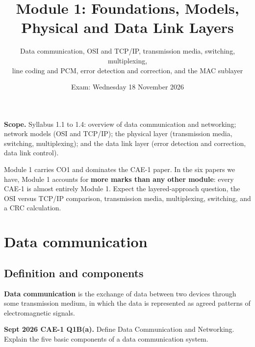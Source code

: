 \documentclass[11pt,a4paper]{article}
\title{\textbf{Module 1: Foundations, Models, Physical and Data Link Layers}\\}
\author{\large Data communication, OSI and TCP/IP, transmission media, switching, multiplexing,\\
line coding and PCM, error detection and correction, and the MAC sublayer}
\date{Exam: Wednesday 18 November 2026}
\begin{document}
\maketitle

\begin{exambox}
\textbf{Scope.} Syllabus 1.1 to 1.4: overview of data communication and networking; network models (OSI and TCP/IP); the physical layer (transmission media, switching, multiplexing); and the data link layer (error detection and correction, data link control).

Module 1 carries CO1 and dominates the CAE-1 paper. In the six papers we have, Module 1 accounts for \textbf{more marks than any other module}: every CAE-1 is almost entirely Module 1. Expect the layered-approach question, the OSI versus TCP/IP comparison, transmission media, multiplexing, switching, and a CRC calculation.
\end{exambox}

\tableofcontents
\newpage

\section{Data communication}

\subsection{Definition and components}

\textbf{Data communication} is the exchange of data between two devices through some transmission medium, in which the data is represented as agreed patterns of electromagnetic signals.

\begin{pyqbox}
\textbf{Sept 2026 CAE-1 Q1B(a).} Define Data Communication and Networking. Explain the five basic components of a data communication system.
\end{pyqbox}
\end{document}
